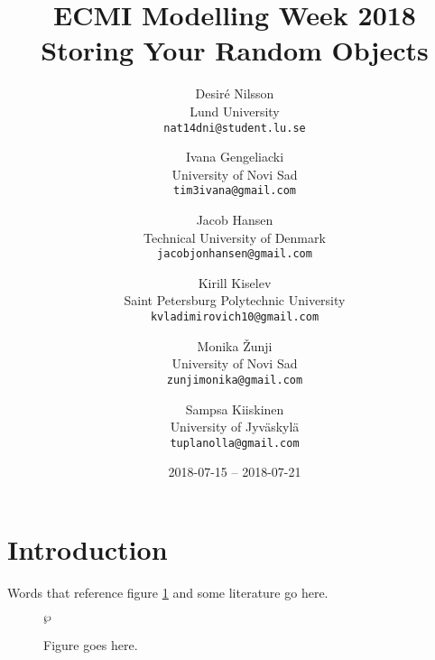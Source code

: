\documentclass[draft, 12pt, sumlimits, intlimits]{article}
\title{ECMI Modelling Week 2018 \\ Storing Your Random Objects}
\author{Desiré Nilsson \\ Lund University \\
\texttt{nat14dni@student.lu.se} \and
Ivana Gengeliacki \\ University of Novi Sad \\
\texttt{tim3ivana@gmail.com} \and
Jacob Hansen \\ Technical University of Denmark \\
\texttt{jacobjonhansen@gmail.com} \and
Kirill Kiselev \\ Saint Petersburg Polytechnic University \\
\texttt{kvladimirovich10@gmail.com} \and
Monika Žunji \\ University of Novi Sad \\
\texttt{zunjimonika@gmail.com} \and
Sampsa Kiiskinen \\ University of Jyväskylä \\
\texttt{tuplanolla@gmail.com}}
\date{2018-07-15 -- 2018-07-21}
\begin{document}
\maketitle

\section{Introduction}

Words that reference figure \ref{f/stuff} and
some literature \cite{conway-1998} go here.

\begin{figure}
  \centering
  $\wp$ %
  \caption{Figure goes here.}
  \label{f/stuff}
\end{figure}

\printbibliography
\end{document}
